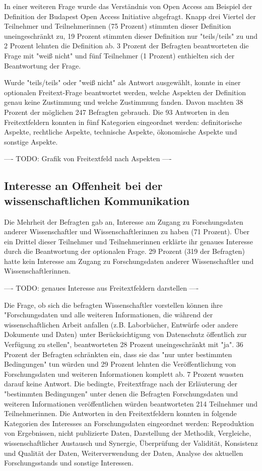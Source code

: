 In einer weiteren Frage wurde das Verständnis von Open Access am Beispiel der Definition der Budapest Open Access Initiative \cite{boai_2012} abgefragt. Knapp drei Viertel der Teilnehmer und Teilnehmerinnen (75 Prozent) stimmten dieser Definition uneingeschränkt zu, 19 Prozent stimmten dieser Definition nur "teils/teils" zu und 2 Prozent lehnten die Definition ab. 3 Prozent der Befragten beantworteten die Frage mit "weiß nicht" und fünf Teilnehmer (1 Prozent) enthielten sich der Beantwortung der Frage.

Wurde "teils/teils" oder "weiß nicht" als Antwort ausgewählt, konnte in einer optionalen Freitext-Frage beantwortet werden, welche Aspekten der Definition genau keine Zustimmung und welche Zustimmung fanden. Davon machten 38 Prozent der möglichen 247 Befragten gebrauch. Die 93 Antworten in den Freitextfeldern konnten in fünf Kategorien eingeordnet werden: definitorische Aspekte, rechtliche Aspekte, technische Aspekte, ökonomische Aspekte und sonstige Aspekte.

---- TODO: Grafik von Freitextfeld nach Aspekten ----

\subsection{Interesse an Offenheit bei der wissenschaftlichen Kommunikation}

Die Mehrheit der Befragten gab an, Interesse am Zugang zu Forschungsdaten anderer Wissenschaftler und Wissenschaftlerinnen zu haben (71 Prozent). Über ein Drittel dieser Teilnehmer und Teilnehmerinnen erklärte ihr genaues Interesse durch die Beantwortung der optionalen Frage. 29 Prozent (319 der Befragten) hatte kein Interesse am Zugang zu Forschungsdaten anderer Wissenschaftler und Wissenschaftlerinnen.

---- TODO: genaues Interesse aus Freitextfeldern darstellen ----

Die Frage, ob sich die befragten Wissenschaftler vorstellen können ihre "Forschungsdaten und alle weiteren Informationen, die während der wissenschaftlichen Arbeit anfallen (z.B. Laborbücher, Entwürfe oder andere Dokumente und Daten) unter Berücksichtigung von Datenschutz öffentlich zur Verfügung zu stellen", beantworteten 28 Prozent uneingeschränkt mit "ja". 36 Prozent der Befragten schränkten ein, dass sie das "nur unter bestimmten Bedingungen" tun würden und 29 Prozent lehnten die Veröffentlichung von Forschungsdaten und weiteren Informationen komplett ab. 7 Prozent wussten darauf keine Antwort. Die bedingte, Freitextfrage nach der Erläuterung der "bestimmten Bedingungen" unter denen die Befragten Forschungsdaten und weiteren Informationen veröffentlichen würden beantworteten 214 Teilnehmer und Teilnehmerinnen. Die Antworten in den Freitextfeldern konnten in folgende Kategorien des Interesses an Forschungsdaten eingeordnet werden: Reproduktion von Ergebnissen, nicht publizierte Daten, Darstellung der Methodik, Vergleiche, wissenschaftlicher Austausch und Synergie, Überprüfung der Validität, Konsistenz und Qualität der Daten, Weiterverwendung der Daten, Analyse des aktuellen Forschungsstands und sonstige Interessen.

